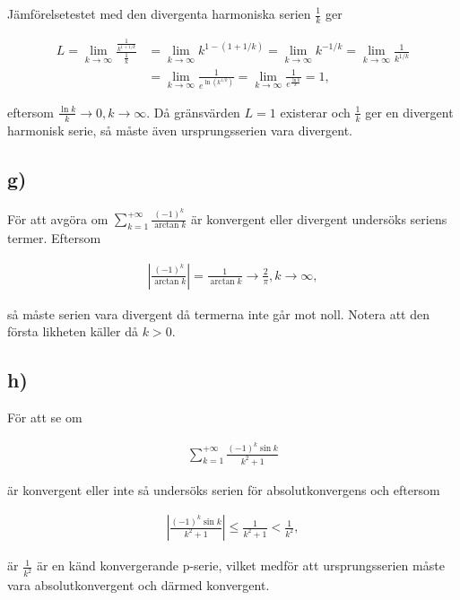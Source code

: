 \documentclass[a4paper]{article}
\begin{document}
Jämförelsetestet med den divergenta harmoniska serien $\frac{1}{k}$ ger

\begin{align*}
  L = \lim_{k\to\infty} \frac{\frac{1}{k^{1+1/k}}}{\frac{1}{k}} &= \lim_{k\to\infty}k^{1-(1+1/k)} = \lim_{k\to\infty}k^{-1/k} = \lim_{k\to\infty}\frac{1}{k^{1/k}}\\ &= \lim_{k\to\infty} \frac{1}{e^{\ln(k^{1/k})}} = \lim_{k\to\infty} \frac{1}{e^{\frac{\ln k}{k}}} = 1,
\end{align*}

\noindent eftersom $\frac{\ln k}{k} \to 0, k \to \infty$. Då gränsvärden $L = 1$ existerar och $\frac{1}{k}$ ger en divergent harmonisk serie, så måste även
ursprungsserien vara divergent.

\subsection*{g)}

För att avgöra om $\sum_{k=1}^{+\infty}\frac{(-1)^k}{\arctan k}$ är konvergent
eller divergent undersöks seriens termer. Eftersom

\begin{align*}
  \left| \frac{(-1)^k}{\arctan k} \right| = \frac{1}{\arctan k} \to \frac{2}{\pi}, k \to \infty,
\end{align*}

\noindent så måste serien vara divergent då termerna inte går mot noll. Notera att den
första likheten käller då $k > 0$.

\subsection*{h)}

För att se om

\begin{align*}
  \sum_{k=1}^{+\infty} \frac{(-1)^k\sin k}{k^2 + 1}
\end{align*}

\noindent är konvergent eller inte så undersöks serien för absolutkonvergens och eftersom 

\begin{align*}
  \left| \frac{(-1)^k\sin k}{k^2 + 1} \right| \leq \frac{1}{k^2 + 1} < \frac{1}{k^2},
\end{align*}

\noindent är $\frac{1}{k^2}$ är en känd konvergerande p-serie, vilket medför att
ursprungsserien måste vara absolutkonvergent och därmed konvergent.
\end{document}
